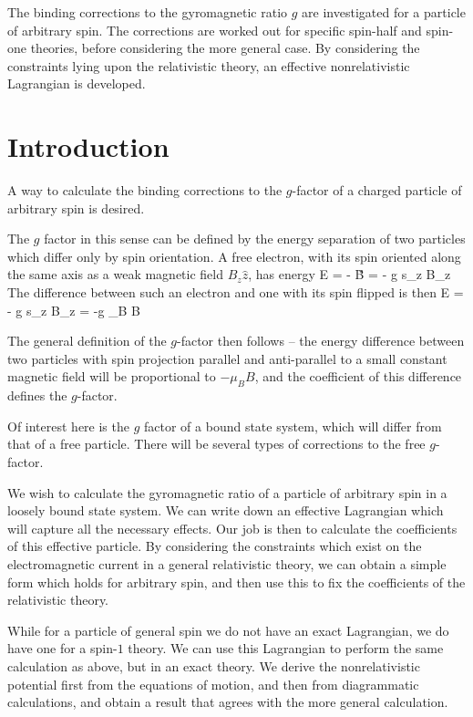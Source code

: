 The binding corrections to the gyromagnetic ratio $g$ are investigated for a particle of arbitrary spin.  The corrections are worked out for specific spin-half and spin-one theories, before considering the more general case.  By considering the constraints lying upon the relativistic theory, an effective nonrelativistic Lagrangian is developed.

\chapter{Introduction}


A way to calculate the binding corrections to the $g$-factor of a charged particle of arbitrary spin is desired.

The $g$ factor in this sense can be defined by the energy separation of two particles which differ only by spin orientation.  A free electron, with its spin oriented along the same axis as a weak magnetic field $B_z\hat{z}$, has energy
\beq
 E = - \gv{\mu} \cdot \v{B} = - g s_z B_z
\eeq
The difference between such an electron and one with its spin flipped is then
\beq
	\delta E = - g s_z B_z = -g \mu_B B
\eeq


The general definition of the $g$-factor then follows -- the energy difference between two particles with spin projection parallel and anti-parallel to a small constant magnetic field will be proportional to $ - \mu_B B$, and the coefficient of this difference defines the $g$-factor.

Of interest here is the $g$ factor of a bound state system, which will differ from that of a free particle.  There will be several types of corrections to the free $g$-factor.





We wish to calculate the gyromagnetic ratio of a particle of arbitrary spin in a loosely bound state system.  We can write down an effective Lagrangian which will capture all the necessary effects.  Our job is then to calculate the coefficients of this effective particle.  By considering the constraints which exist on the electromagnetic current in a general relativistic theory, we can obtain a simple form which holds for arbitrary spin, and then use this to fix the coefficients of the relativistic theory.

While for a particle of general spin we do not have an exact Lagrangian, we do have one for a spin-$1$ theory.  We can use this Lagrangian to perform the same calculation as above, but in an exact theory.  We derive the nonrelativistic potential first from the equations of motion, and then from diagrammatic calculations, and obtain a result that agrees with the more general calculation.  

